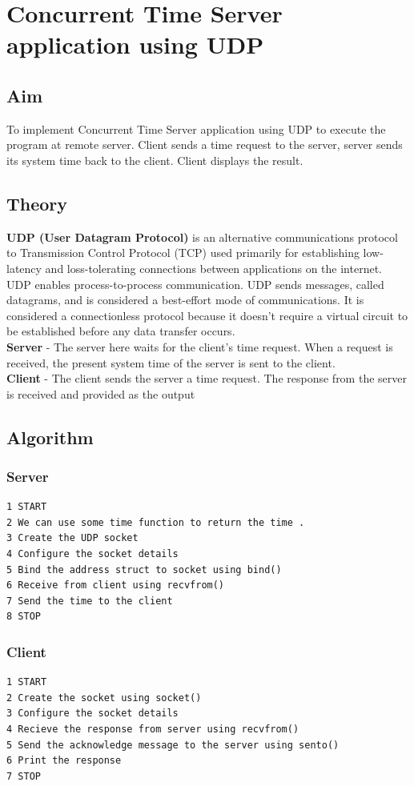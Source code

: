 \section{Concurrent Time Server application using UDP}
\subsection{Aim}
To implement Concurrent Time Server application using UDP to execute the program at remote server. Client sends a time request to the server, server sends its
system time back to the client. Client displays the result.

\subsection{Theory}
\textbf{UDP (User Datagram Protocol)} is an alternative communications protocol to
Transmission Control Protocol (TCP) used primarily for establishing low-latency
and loss-tolerating connections between applications on the internet. UDP enables
process-to-process communication. UDP sends messages, called datagrams, and is
considered a best-effort mode of communications. It is considered a connectionless
protocol because it doesn’t require a virtual circuit to be established before any data
transfer occurs.\\
\textbf{Server} - The server here waits for the client’s time request. When a request is
received, the present system time of the server is sent to the client.\\
\textbf{Client} - The client sends the server a time request. The response from the server
is received and provided as the output
\subsection{Algorithm}
\subsubsection{Server}
\begin{verbatim}
1 START
2 We can use some time function to return the time .
3 Create the UDP socket
4 Configure the socket details
5 Bind the address struct to socket using bind()
6 Receive from client using recvfrom()
7 Send the time to the client
8 STOP
\end{verbatim}

\subsubsection{Client}
\begin{verbatim}
1 START
2 Create the socket using socket()
3 Configure the socket details
4 Recieve the response from server using recvfrom()
5 Send the acknowledge message to the server using sento()
6 Print the response
7 STOP
\end{verbatim}

